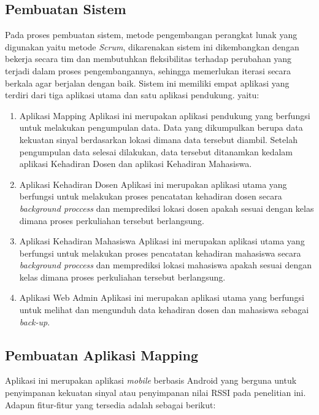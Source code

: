 \subsection{Pembuatan Sistem}
Pada proses pembuatan sistem, metode pengembangan perangkat lunak yang digunakan yaitu metode \textit{Scrum}, dikarenakan sistem ini dikembangkan dengan bekerja secara tim dan membutuhkan fleksibilitas terhadap perubahan yang terjadi dalam proses pengembangannya, sehingga memerlukan iterasi secara berkala agar berjalan dengan baik. Sistem ini memiliki empat aplikasi yang terdiri dari tiga aplikasi utama dan satu aplikasi pendukung. yaitu:
\begin{enumerate}
\item Aplikasi Mapping 
\newline Aplikasi ini merupakan aplikasi pendukung yang berfungsi untuk melakukan pengumpulan data. Data yang dikumpulkan berupa data kekuatan sinyal berdasarkan lokasi dimana data tersebut diambil. Setelah pengumpulan data selesai dilakukan, data tersebut ditanamkan kedalam aplikasi Kehadiran Dosen dan aplikasi Kehadiran Mahasiswa.

\item Aplikasi Kehadiran Dosen
\newline Aplikasi ini merupakan aplikasi utama yang berfungsi untuk melakukan proses pencatatan kehadiran dosen secara \textit{background proccess} dan memprediksi lokasi dosen apakah sesuai dengan kelas dimana proses perkuliahan tersebut berlangsung.

\item Aplikasi Kehadiran Mahasiswa
\newline Aplikasi ini merupakan aplikasi utama yang berfungsi untuk melakukan proses pencatatan kehadiran mahasiswa secara \textit{background proccess} dan memprediksi lokasi mahasiswa apakah sesuai dengan kelas dimana proses perkuliahan tersebut berlangsung.

\item Aplikasi Web Admin
\newline Aplikasi ini merupakan aplikasi utama yang berfungsi untuk melihat dan mengunduh data kehadiran dosen dan mahasiswa sebagai \textit{back-up}.
\end{enumerate}

\subsection{Pembuatan Aplikasi Mapping}
\par Aplikasi ini merupakan aplikasi \textit{mobile} berbasis Android yang berguna untuk penyimpanan kekuatan sinyal atau penyimpanan nilai RSSI pada penelitian ini. Adapun fitur-fitur yang tersedia adalah sebagai berikut:

